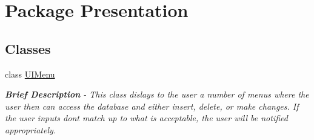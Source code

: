 \hypertarget{namespace_presentation}{}\section{Package Presentation}
\label{namespace_presentation}
\subsection*{Classes}
\begin{DoxyCompactItemize}
\item 
class \hyperlink{class_presentation_1_1_u_i_menu}{U\+I\+Menu}
\begin{DoxyCompactList}\small\item\em {\bfseries Brief Description} -\/ This class dislays to the user a number of menus where the user then can access the database and either insert, delete, or make changes. If the user inputs don\textquotesingle{}t match up to what is acceptable, the user will be notified appropriately. \end{DoxyCompactList}\end{DoxyCompactItemize}
